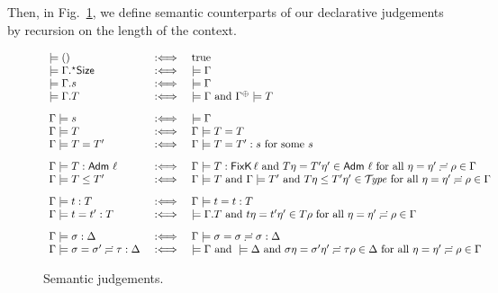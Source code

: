 \documentclass[acmsmall%
]{acmart}\settopmatter{printfolios=true}
\begin{document}
\noindent
Then, in Fig.~\ref{fig:sem}, we define semantic counterparts of our declarative judgements by recursion on the length of the context.
\begin{figure}
\hrulefill
\[
\begin{array}{l@{\quad}l@{\quad}l}
  \models () & \defas & \mtrue \\
  \models \eext \Gamma \Size & \defas & \models \Gamma \\
  \models \cext \Gamma s     & \defas & \models \Gamma \\
  \models \cext \Gamma T     & \defas & \models \Gamma \mand \resurrect\Gamma \models T
\\[2ex]
  \Gamma \models s & \defas & \models \Gamma \\
  \Gamma \models T & \defas & \Gamma \models T = T \\
  \Gamma \models T = T' & \defas & \Gamma \models T = T' : s \mforsome s %
\\[2ex]
  \Gamma \models T : \Adm\,\ell & \defas & \Gamma \models T : \FixK\,\ell \mand
    T\eta = T'\eta' \in \Adm\,\ell
    \mforall \eta = \eta' \eeq \rho \in \Gamma
\\
  \Gamma \models T \leq T' & \defas & \Gamma \models T \mand \Gamma \models T' \mand
    T\eta \leq T'\eta' \in \TYPE
    \mforall \eta = \eta' \eeq \rho \in \Gamma
\\[2ex]
  \Gamma \models t : T & \defas & \Gamma \models t = t : T \\
  \Gamma \models t = t' : T & \defas & %
    \models \cext \Gamma T \mand
    t \eta = t' \eta' \in T \rho \mforall \eta = \eta' \eeq \rho \in \Gamma
\\[2ex]
  \Gamma \models \sigma : \Delta & \defas & \Gamma \models \sigma = \sigma \eeq \sigma : \Delta \\
  \Gamma \models \sigma = \sigma' \eeq \tau : \Delta & \defas &
    \models \Gamma \mand \models \Delta \mand
    \sigma \eta = \sigma' \eta' \eeq \tau \rho \in \Delta
    \mforall \eta = \eta' \eeq \rho \in \Gamma
\end{array}
\]
\hrulefill
\caption{Semantic judgements.\label{fig:sem}}
\end{figure}
\end{document}
